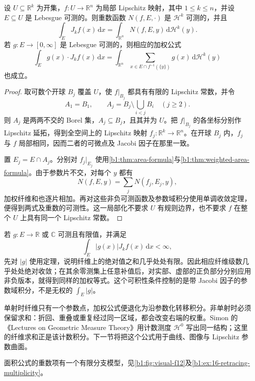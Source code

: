\begin{corollary}[局部面积公式]\label{b1:cor:local-area-formulas}
设 \(U\subseteq\mathbb R^k\) 为开集，\(f:U\rightarrow\mathbb R^n\) 为局部 Lipschitz 映射，其中 \(1\leq k\leq n\)，并设 \(E\subseteq U\) 是 Lebesgue 可测的。则重数函数 \(N(f,E,\cdot)\) 是 \(\mathcal H^k\) 可测的，并且
\[
 \int_EJ_kf(x)\,\mathrm dx
 =
 \int_{\mathbb R^n}N(f,E,y)\,\mathrm d\mathcal H^k(y).
\]
若 \(g:E\rightarrow[0,\infty]\) 是 Lebesgue 可测的，则相应的加权公式
\[
 \int_Eg(x)\cdot J_kf(x)\,\mathrm dx
 =
 \int_{\mathbb R^n}
 \sum_{x\in E\cap f^{-1}(\{y\})}g(x)\,
 \mathrm d\mathcal H^k(y)
\]
也成立。
\end{corollary}
\begin{proof}
取可数个开球 \(B_j\) 覆盖 \(U\)，使 \(f|_{B_j}\) 都具有有限的 Lipschitz 常数，并令
\[
 A_1=B_1,
 \qquad
 A_j=B_j\setminus\bigcup_{i<j}B_i\quad(j\geq2).
\]
则 \(A_j\) 是两两不交的 Borel 集，\(A_j\subseteq B_j\)，且其并为 \(U\)。把 \(f|_{B_j}\) 的各坐标分别作 Lipschitz 延拓，得到全空间上的 Lipschitz 映射 \(f_j:\mathbb R^k\rightarrow\mathbb R^n\)。在开球 \(B_j\) 内，\(f_j\) 与 \(f\) 局部相同，因而二者的可微点及 Jacobi 因子在那里一致。

置 \(E_j=E\cap A_j\)。分别对 \(f_j|_{E_j}\) 使用\cref{b1:thm:area-formula}与\cref{b1:thm:weighted-area-formula}。由于参数片不交，对每个 \(y\) 都有
\[
 N(f,E,y)=\sum_jN(f_j,E_j,y),
\]
加权纤维和也逐片相加。再对这些非负可测函数及参数域积分使用单调收敛定理，便得到两式及重数的可测性。这一局部化不要求 \(U\) 有规则边界，也不要求 \(f\) 在整个 \(U\) 上具有同一个 Lipschitz 常数。
\end{proof}

若 \(g:E\rightarrow\mathbb R\) 或 \(\mathbb C\) 可测且有限值，并满足
\[
 \int_E |g(x)|J_kf(x)\,\mathrm dx<\infty,
\]
先对 \(|g|\) 使用定理，说明纤维上的绝对值之和几乎处处有限。因此相应纤维级数几乎处处绝对收敛；在其余零测集上任意补值后，对实部、虚部的正负部分分别应用非负版本，就得到同样的加权等式。这个可积性条件控制的是带 Jacobi 因子的参数域积分，不是无权的 \(\int_E|g|\)。

\ProseParagraphBreak

单射时纤维只有一个参数点，加权公式便退化为沿参数化转移积分。非单射时必须保留求和：折回、重叠或重复经过同一区域，都会改变右端的权重。Simon 的《Lectures on Geometric Measure Theory》\cite[8.4--8.5]{Simon1983Lectures}用计数测度 \(\mathcal H^0\) 写出同一结构；这里的纤维求和正是该计数积分。下一节将把这个公式用于曲线、图像与 Lipschitz 参数曲面。

面积公式的重数项有一个有限分支模型，见\cref{b1:fig:visual-f12}及\cref{b1:ex:16-retracing-multiplicity}。

